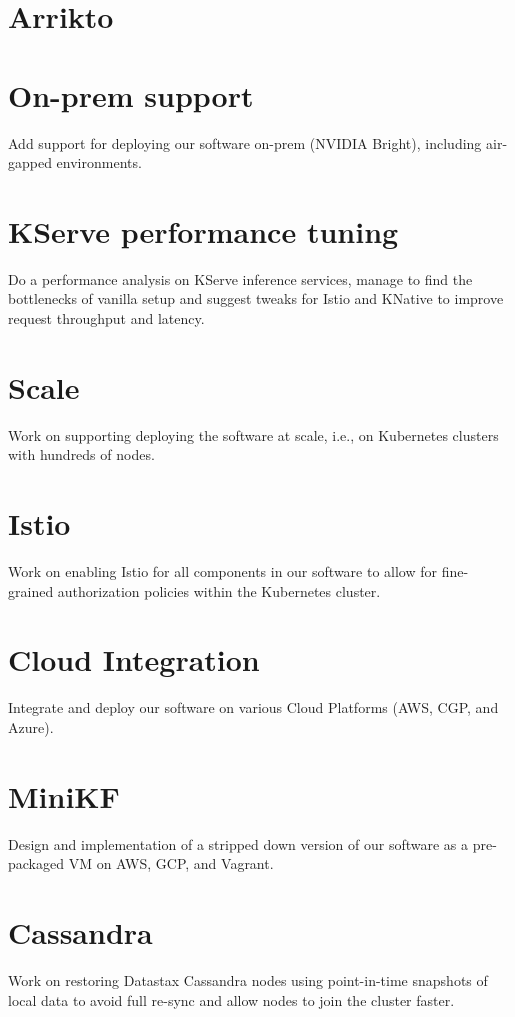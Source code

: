 \documentclass[margin,centered]{res}
\begin{document}
\begin{resume}
\section{Arrikto}

\section{\sc On-prem support}
Add support for deploying our software on-prem (NVIDIA Bright), including
air-gapped environments.

\section{\sc KServe performance tuning}
Do a performance analysis on KServe inference services, manage to find the
bottlenecks of vanilla setup and suggest tweaks for Istio and KNative to
improve request throughput and latency.

\section{\sc Scale}
Work on supporting deploying the software at scale, i.e., on Kubernetes
clusters with hundreds of nodes.

\section{\sc Istio}
Work on enabling Istio for all components in our software to allow for
fine-grained authorization policies within the Kubernetes cluster.

\section{\sc Cloud Integration}
Integrate and deploy our software on various Cloud Platforms (AWS, CGP, and
Azure).

\section{\sc MiniKF}
Design and implementation of a stripped down version of our software as a
pre-packaged VM on AWS, GCP, and Vagrant.

\section{\sc Cassandra}
Work on restoring Datastax Cassandra nodes using point-in-time snapshots
of local data to avoid full re-sync and allow nodes to join the cluster faster.


\end{resume}
\end{document}

